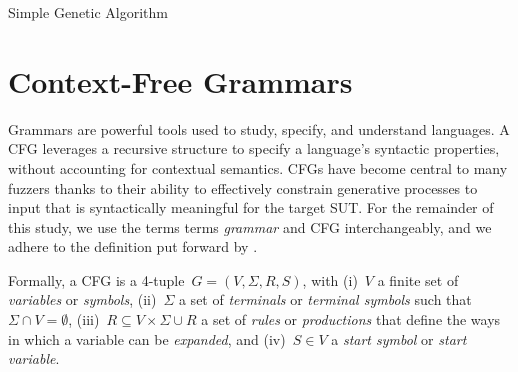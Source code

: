 \begin{algorithm}
	\caption{Simple Genetic Algorithm}
	\BlankLine
	\DontPrintSemicolon
	
\label{alg:sga}
\end{algorithm}


\section{Context-Free Grammars}

Grammars are powerful tools used to study, specify,
and understand languages. 
A \Gls{CFG} leverages a recursive structure to
specify a language's syntactic properties, without accounting for
contextual semantics.
\gls{CFG}s have become central to many fuzzers thanks to their ability 
to effectively constrain generative processes to
input that is syntactically meaningful for the target \gls{SUT}.
For the remainder of this study, we use the terms terms \textit{grammar} 
and \gls{CFG} interchangeably, and we adhere to the definition put forward
by \citet{sipser1996introduction}.

Formally, a \gls{CFG} is a 4-tuple~$G=(V, \Sigma, R, S)$,
with (i)~$V$ a finite set of \textit{variables} or \textit{symbols},
(ii)~$\Sigma$ a set of \textit{terminals} or \textit{terminal symbols} 
such that $\Sigma \cap V = \emptyset$,
(iii)~$R \subseteq V \times \Sigma \cup R$
a set of \textit{rules} or \textit{productions} that define the ways in which a variable can be \textit{expanded}, and (iv)~$S \in V$ a \textit{start symbol} or \textit{start variable}.

